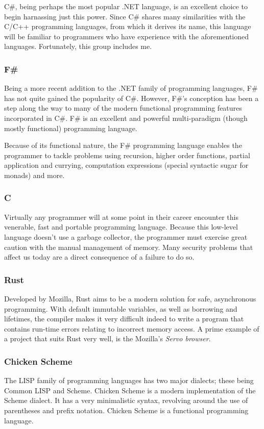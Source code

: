 \documentclass{article}
\begin{document}
C\#, being perhaps the most popular .NET language, is an excellent choice to begin harnassing just this power.
Since C\# shares many similarities with the C/C++ programming languages, from which it derives its name,
this language will be familiar to programmers who have experience with the aforementioned languages.
Fortunately, this group includes me.

\subsubsection{F\#}
Being a more recent addition to the .NET family of programming languages, F\# has not quite gained the popularity of C\#.
However, F\#'s conception has been a step along the way to many of the modern functional programming features incorporated in C\#.
F\# is an excellent and powerful multi-paradigm (though mostly functional) programming language.

Because of its functional nature, the F\# programming language enables the programmer to tackle problems using
recursion, higher order functions, partial application and currying, computation expressions (special syntactic sugar for monads) and more.

\subsubsection{C}
Virtually any programmer will at some point in their career encounter this venerable, fast and portable programming language.
Because this low-level language doesn't use a garbage collector, the programmer must exercise great caution with the manual management of memory.
Many security problems that affect us today are a direct consequence of a failure to do so.

\subsubsection{Rust}
Developed by Mozilla, Rust aims to be a modern solution for safe, asynchronous programming.
With default immutable variables, as well as borrowing and lifetimes, the compiler makes it
very difficult indeed to write a program that contains run-time errors relating to incorrect memory access.
A prime example of a project that suits Rust very well, is the Mozilla's {\em Servo browser}.

\subsubsection{Chicken Scheme}
The LISP family of programming languages has two major dialects; these being Common LISP and Scheme.
Chicken Scheme is a modern implementation of the Scheme dialect.
It has a very minimalistic syntax, revolving around the use of parentheses and prefix notation.
Chicken Scheme is a functional programming language.
\end{document}
